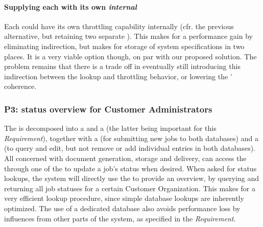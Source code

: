 \paragraph{Supplying each  with its own \emph{internal} }
Each  could have its own throttling capability internally (cfr. the previous alternative, but retaining two separate ). This makes for a performance gain by eliminating indirection, but makes for storage of system specifications in two places. It is a very viable option though, on par with our proposed solution. The problem remains that there is a trade off in eventually still introducing this indirection between the lookup and throttling behavior, or lowering the ' coherence.

\subsubsection{P3: status overview for Customer Administrators}\label{march:p3}
The  is decomposed into a  and a  (the latter being important for this \emph{Requirement}), together with a  (for submitting new jobs to both databases) and a  (to query and edit, but not remove or add individual entries in both databases). All  concerned with document generation, storage and delivery, can access the  through one of the  to update a job's status when desired. When asked for status lookups, the system will directly use the  to provide an overview, by querying and returning all job statuses for a certain Customer Organization. This makes for a very efficient lookup procedure, since simple database lookups are inherently optimized. The use of a dedicated database also avoids performance loss by influences from other parts of the system, as specified in the \emph{Requirement}.

